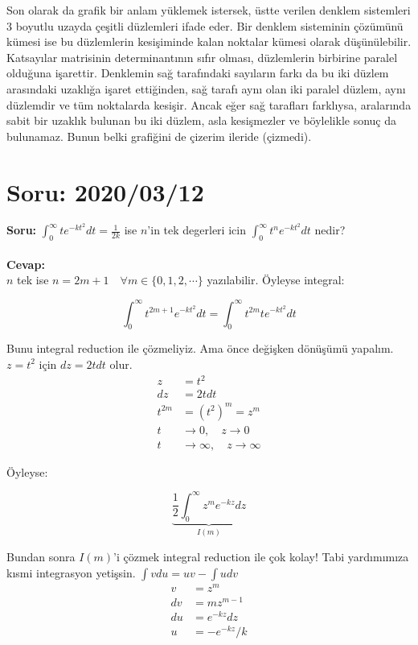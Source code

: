\documentclass{article}
\numberwithin{equation}{section}
\begin{document}
Son olarak da grafik bir anlam yüklemek istersek, üstte verilen denklem sistemleri 3 boyutlu uzayda çeşitli düzlemleri ifade eder. Bir denklem sisteminin çözümünü kümesi ise bu düzlemlerin kesişiminde kalan noktalar kümesi olarak düşünülebilir. Katsayılar matrisinin determinantının sıfır olması, düzlemlerin birbirine paralel olduğuna işarettir. Denklemin sağ tarafındaki sayıların farkı da bu iki düzlem arasındaki uzaklığa işaret ettiğinden, sağ tarafı aynı olan iki paralel düzlem, aynı düzlemdir ve tüm noktalarda kesişir. Ancak eğer sağ tarafları farklıysa, aralarında sabit bir uzaklık bulunan bu iki düzlem, asla kesişmezler ve böylelikle sonuç da bulunamaz. Bunun belki grafiğini de çizerim ileride (çizmedi).
 






\section{Soru: 2020/03/12}
\textbf{Soru:} $\int_0^\infty te^{-kt^2}dt = \frac{1}{2k}$ ise $n$'in tek degerleri icin $\int_0^\infty t^ne^{-kt^2}dt$ nedir?
\\ \\
\textbf{Cevap: }\\

$n$ tek ise $n = 2m+1 \quad \forall m \in \{0,1,2,\cdots \}$ yazılabilir. Öyleyse integral: 

\begin{equation}
    \int_0^\infty t^{2m+1}e^{-kt^2}dt = \int_0^\infty t^{2m}te^{-kt^2}dt
\end{equation}

Bunu integral reduction ile çözmeliyiz. Ama önce değişken dönüşümü yapalım. $z = t^2$ için $dz = 2tdt$ olur.
\begin{align}
    z &= t^2 \\
    dz&= 2tdt \\
    t^{2m} &= (t^2)^m = z^m \\
    t &\rightarrow 0, \quad z \rightarrow 0 \\
    t &\rightarrow \infty, \quad  z \rightarrow \infty
\end{align}

Öyleyse:

\begin{equation}
     \underbrace{\frac{1}{2} \int_0^\infty z^m e^{-kz}dz}_{I(m)}
\end{equation}

Bundan sonra $I(m)$'i çözmek integral reduction ile çok kolay! Tabi yardımımıza kısmi integrasyon yetişsin. $\int vdu = uv - \int udv$
\begin{align}
    v &= z^m \\
    dv&= mz^{m-1} \\
    du&= e^{-kz}dz \\
    u &= -e^{-kz}/k 
\end{align}
\end{document}
